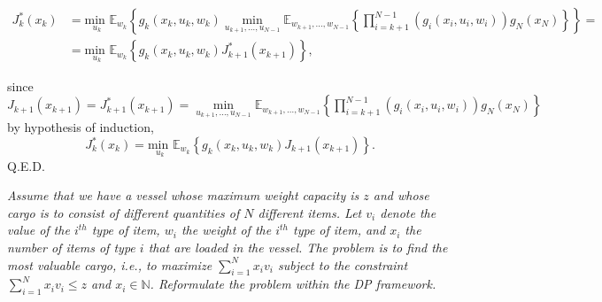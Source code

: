 \documentclass[11pt, english]{article}
\begin{document}
\begin{align*}
	J_k^*(x_k) & =\underset{u_k}{\text{min }}\mathbb{E}_{w_k}\left\{g_k(x_k,u_k,w_k)\underset{u_{k+1},\dots,u_{N-1}}{\min}\mathbb{E}_{w_{k+1},\dots,w_{N-1}}\left\{\prod\limits_{i=k+1}^{N-1}\left(g_i(x_i,u_i,w_i)\right)g_N(x_N)\right\} \right\}=\\
	& =\underset{u_k}{\text{min }}\mathbb{E}_{w_k}\left\{g_k(x_k,u_k,w_k)J_{k+1}^*(x_{k+1})\right\},
\end{align*}
 
since $J_{k+1}(x_{k+1})=J_{k+1}^*(x_{k+1})=\underset{u_{k+1},\dots,u_{N-1}}{\min}\mathbb{E}_{w_{k+1},\dots,w_{N-1}}\left\{\prod\limits_{i=k+1}^{N-1}\left(g_i(x_i,u_i,w_i)\right)g_N(x_N)\right\}$ by hypothesis of induction,
$$J_k^*(x_k)=\underset{u_k}{\text{min }}\mathbb{E}_{w_k}\left\{g_k(x_k,u_k,w_k)J_{k+1}(x_{k+1})\right\}.$$
Q.E.D.

 \textit{Assume that we have a vessel whose maximum weight capacity is $z$ and whose cargo is to consist of different quantities of $N$ diﬀerent items. Let $v_i$ denote the value of the $i^{th}$ type of item, $w_i$ the weight of the $i^{th}$ type of item, and $x_i$ the number of items of type $i$ that are loaded in the vessel. The problem is to ﬁnd the most valuable cargo, i.e., to maximize $\sum_{i = 1}^Nx_iv_i$ subject to the constraint $\sum_{i = 1}^Nx_iv_i \leq z$ and $x_i \in \mathbb{N}$. Reformulate the problem within the DP framework.}
\end{document}
